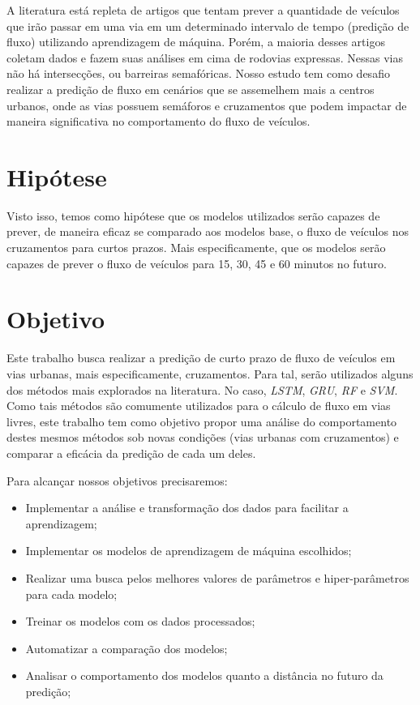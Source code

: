 A literatura está repleta de artigos que tentam prever a quantidade de veículos que irão passar em uma via em um determinado intervalo de tempo (predição de fluxo) utilizando aprendizagem de máquina. Porém, a maioria desses artigos coletam dados e fazem suas análises em cima de rodovias expressas. Nessas vias não há intersecções, ou barreiras semafóricas. Nosso estudo tem como desafio realizar a predição de fluxo em cenários que se assemelhem mais a centros urbanos, onde as vias possuem semáforos e cruzamentos que podem impactar de maneira significativa no comportamento do fluxo de veículos.

\section{Hipótese}


Visto isso, temos como hipótese que os modelos utilizados serão capazes de prever, de maneira eficaz se comparado aos modelos base, o fluxo de veículos nos cruzamentos para curtos prazos. Mais especificamente, que os modelos serão capazes de prever o fluxo de veículos para 15, 30, 45 e 60 minutos no futuro.

\section{Objetivo}

Este trabalho busca realizar a predição de curto prazo de fluxo de veículos em vias urbanas, mais especificamente, cruzamentos. Para tal, serão utilizados alguns dos métodos mais explorados na literatura. No caso, \textit{\acrfull{LSTM}}, \textit{\acrfull{GRU}}, \textit{\acrfull{RF}} e \textit{\acrfull{SVM}}. Como tais métodos são comumente utilizados para o cálculo de fluxo em vias livres, este trabalho tem como objetivo propor uma análise do comportamento destes mesmos métodos sob novas condições (vias urbanas com cruzamentos) e comparar a eficácia da predição de cada um deles.

Para alcançar nossos objetivos precisaremos:

\begin{itemize}
    \item Implementar a análise e transformação dos dados para facilitar a aprendizagem;
    \item Implementar os modelos de aprendizagem de máquina escolhidos; 
    \item Realizar uma busca pelos melhores valores de parâmetros e hiper-parâmetros para cada modelo;
    \item Treinar os modelos com os dados processados;
    \item Automatizar a comparação dos modelos;
    \item Analisar o comportamento dos modelos quanto a distância no futuro da predição;
\end{itemize}

